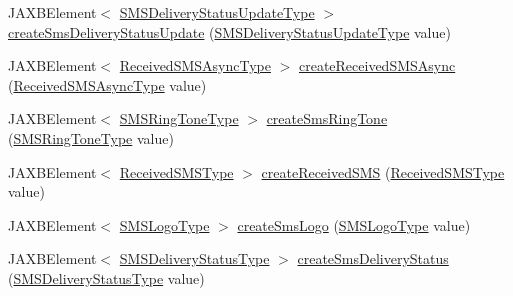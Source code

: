\begin{DoxyCompactItemize}
JAXBElement$<$ \hyperlink{classcom_1_1telefonica_1_1schemas_1_1unica_1_1rest_1_1sms_1_1v1_1_1SMSDeliveryStatusUpdateType}{SMSDeliveryStatusUpdateType} $>$ \hyperlink{classcom_1_1telefonica_1_1schemas_1_1unica_1_1rest_1_1sms_1_1v1_1_1ObjectFactory_a382b46bf0043fc5cdac5046ee9afc020}{createSmsDeliveryStatusUpdate} (\hyperlink{classcom_1_1telefonica_1_1schemas_1_1unica_1_1rest_1_1sms_1_1v1_1_1SMSDeliveryStatusUpdateType}{SMSDeliveryStatusUpdateType} value)
\item 
JAXBElement$<$ \hyperlink{classcom_1_1telefonica_1_1schemas_1_1unica_1_1rest_1_1sms_1_1v1_1_1ReceivedSMSAsyncType}{ReceivedSMSAsyncType} $>$ \hyperlink{classcom_1_1telefonica_1_1schemas_1_1unica_1_1rest_1_1sms_1_1v1_1_1ObjectFactory_ab1de8decdb543dd44266b032f49477f9}{createReceivedSMSAsync} (\hyperlink{classcom_1_1telefonica_1_1schemas_1_1unica_1_1rest_1_1sms_1_1v1_1_1ReceivedSMSAsyncType}{ReceivedSMSAsyncType} value)
\item 
JAXBElement$<$ \hyperlink{classcom_1_1telefonica_1_1schemas_1_1unica_1_1rest_1_1sms_1_1v1_1_1SMSRingToneType}{SMSRingToneType} $>$ \hyperlink{classcom_1_1telefonica_1_1schemas_1_1unica_1_1rest_1_1sms_1_1v1_1_1ObjectFactory_a5c91450bea8d5c05bc85bebed848c270}{createSmsRingTone} (\hyperlink{classcom_1_1telefonica_1_1schemas_1_1unica_1_1rest_1_1sms_1_1v1_1_1SMSRingToneType}{SMSRingToneType} value)
\item 
JAXBElement$<$ \hyperlink{classcom_1_1telefonica_1_1schemas_1_1unica_1_1rest_1_1sms_1_1v1_1_1ReceivedSMSType}{ReceivedSMSType} $>$ \hyperlink{classcom_1_1telefonica_1_1schemas_1_1unica_1_1rest_1_1sms_1_1v1_1_1ObjectFactory_a781aa669f3fa61134db0548430f19bc5}{createReceivedSMS} (\hyperlink{classcom_1_1telefonica_1_1schemas_1_1unica_1_1rest_1_1sms_1_1v1_1_1ReceivedSMSType}{ReceivedSMSType} value)
\item 
JAXBElement$<$ \hyperlink{classcom_1_1telefonica_1_1schemas_1_1unica_1_1rest_1_1sms_1_1v1_1_1SMSLogoType}{SMSLogoType} $>$ \hyperlink{classcom_1_1telefonica_1_1schemas_1_1unica_1_1rest_1_1sms_1_1v1_1_1ObjectFactory_ac5098268ebaacf785fecc962f9241fcb}{createSmsLogo} (\hyperlink{classcom_1_1telefonica_1_1schemas_1_1unica_1_1rest_1_1sms_1_1v1_1_1SMSLogoType}{SMSLogoType} value)
\item 
JAXBElement$<$ \hyperlink{classcom_1_1telefonica_1_1schemas_1_1unica_1_1rest_1_1sms_1_1v1_1_1SMSDeliveryStatusType}{SMSDeliveryStatusType} $>$ \hyperlink{classcom_1_1telefonica_1_1schemas_1_1unica_1_1rest_1_1sms_1_1v1_1_1ObjectFactory_a581185d3f5a85777edebb4b606e1c490}{createSmsDeliveryStatus} (\hyperlink{classcom_1_1telefonica_1_1schemas_1_1unica_1_1rest_1_1sms_1_1v1_1_1SMSDeliveryStatusType}{SMSDeliveryStatusType} value)

\end{DoxyCompactItemize}
